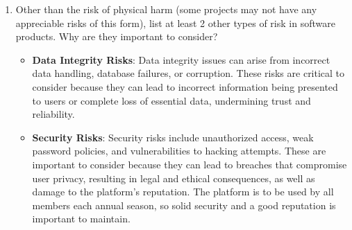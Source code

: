 \documentclass{article}
\begin{document}
\begin{enumerate}
    \item Other than the risk of physical harm (some projects may not have any
    appreciable risks of this form), list at least 2 other types of risk in
    software products. Why are they important to consider?

    \begin{itemize}
        \item \textbf{Data Integrity Risks}: Data integrity issues can arise from incorrect data handling, database failures, or corruption. These risks are critical to consider because they can lead to incorrect information being presented to users or complete loss of essential data, undermining trust and reliability.
        \item \textbf{Security Risks}: Security risks include unauthorized access, weak password policies, and vulnerabilities to hacking attempts. These are important to consider because they can lead to breaches that compromise user privacy, resulting in legal and ethical consequences, as well as damage to the platform's reputation. The platform is to be used by all members each annual season, so solid security and a good reputation is important to maintain.
    \end{itemize}

\end{enumerate}
\end{document}
